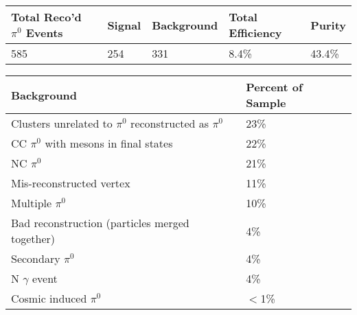 \documentclass[12pt]{article}
\begin{document}
\begin{minipage}{\linewidth}
\centering
{} \label{tab:eff2} 
 \begin{tabular}{| l | l | l | l | l |}
 \hline
 Total Reco'd $\pi^0$ Events & Signal & Background & Total Efficiency & Purity \\ [0.5ex]
 \hline\hline
\hline
  585 & 254 & 331 & 8.4\% & 43.4\% \\ 
\hline 
   \end{tabular}
\end{minipage}

\begin{minipage}{\linewidth}
\centering
{} \label{tab:bkgd} 
 \begin{tabular}{| l | l |}
 \hline
 Background & Percent of Sample \\ [0.5ex]
 \hline\hline
\hline
 Clusters unrelated to $\pi^0$ reconstructed as $\pi^0$ & 23\% \\ \hline
  CC $\pi^0$ with mesons in final states & 22\% \\ \hline
  NC $\pi^0$ & 21\% \\ \hline
Mis-reconstructed vertex & 11\% \\ 
 \hline
 Multiple $\pi^0$ & 10\% \\ \hline
 Bad reconstruction (particles merged together) & 4\% \\ \hline
Secondary $\pi^0$ & 4\% \\ \hline 
N $\gamma$ event & 4\% \\ \hline 
Cosmic induced $\pi^0$ & $<$1\% \\ \hline 
 
   \end{tabular}
\end{minipage}
\\\\
\end{document}
